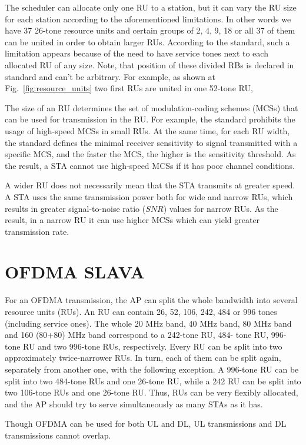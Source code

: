 The scheduler can allocate only one RU to a station, but it can vary the RU size for each station according to the aforementioned limitations.
In other words we have 37 26-tone resource units and certain groups of 2, 4, 9, 18 or all 37 of them can be united in order to obtain larger RUs.
According to the standard, such a limitation appears because of the need to have service tones next to each allocated RU of any size. 
Note, that position of these divided RBs is declared in standard and can't be arbitrary.
For example, as shown at Fig.~\ref{fig:resource_units} two first RUs are united in one 52-tone RU, 

The size of an RU determines the set of modulation-coding schemes (MCSs) that can be used for transmission in the RU.
For example, the standard prohibits the usage of high-speed MCSs in small RUs.
At the same time, for each RU width, the standard defines the minimal receiver sensitivity to signal transmitted with a specific MCS, and the faster the MCS, the higher is the sensitivity threshold.
As the result, a STA cannot use high-speed MCSs if it has poor channel conditions.

A wider RU does not necessarily mean that the STA transmits at greater speed.
A STA uses the same transmission power both for wide and narrow RUs, which results in greater signal-to-noise ratio ($SNR$) values for narrow RUs.
As the result, in a narrow RU it can use higher MCSs which can yield greater transmission rate.

\section{OFDMA SLAVA}

For an OFDMA transmission, the AP can split the whole
bandwidth into several resource units (RUs). An RU can
contain 26, 52, 106, 242, 484 or 996 tones (including service
ones). The whole 20 MHz band, 40 MHz band, 80 MHz band
and 160 (80+80) MHz band correspond to a 242-tone RU, 484-
tone RU, 996-tone RU and two 996-tone RUs, respectively.
Every RU can be split into two approximately twice-narrower
RUs. In turn, each of them can be split again, separately from
another one, with the following exception. A 996-tone RU can
be split into two 484-tone RUs and one 26-tone RU, while a
242 RU can be split into two 106-tone RUs and one 26-tone
RU. Thus, RUs can be very flexibly allocated, and the AP
should try to serve simultaneously as many STAs as it has.

Though OFDMA can be used for both UL and DL, UL
transmissions and DL transmissions cannot overlap.

